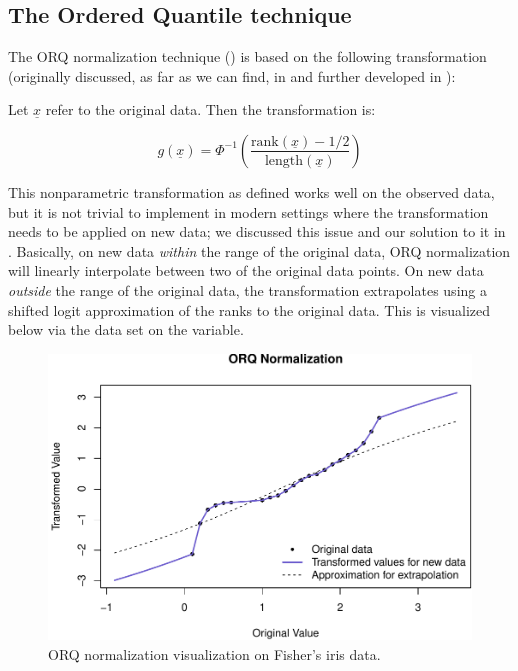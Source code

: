 \hypertarget{the-ordered-quantile-technique}{%
\subsection{The Ordered Quantile
technique}\label{the-ordered-quantile-technique}}

The ORQ normalization technique () is based on the
following transformation (originally discussed, as far as we can find,
in \citet{bartlett1947} and further developed in \citet{van1952}):

Let \(\underline x\) refer to the original data. Then the transformation
is:

\[
g(\underline x) = \Phi ^{-1} \left(\frac{\text{rank} (\underline x) - 1/2}{\text{length}(\underline x) }\right)
\]

This nonparametric transformation as defined works well on the observed
data, but it is not trivial to implement in modern settings where the
transformation needs to be applied on new data; we discussed this issue
and our solution to it in \citet{orq_paper}. Basically, on new data
\emph{within} the range of the original data, ORQ normalization will
linearly interpolate between two of the original data points. On new
data \emph{outside} the range of the original data, the transformation
extrapolates using a shifted logit approximation of the ranks to the
original data. This is visualized below via the  data set on
the  variable.

\begin{Schunk}
\begin{figure}

{\centering \includegraphics[width=1\linewidth]{figs/orq_vis-1} 

}

\caption[ORQ normalization visualization on Fisher's iris data]{ORQ normalization visualization on Fisher's iris data.}\label{fig:orq_vis}
\end{figure}
\end{Schunk}

